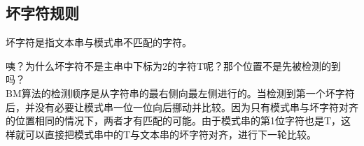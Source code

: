 \subsection{坏字符规则}

坏字符是指文本串与模式串不匹配的字符。

\begin{table}[H]
	\centering
\end{table}

咦？为什么坏字符不是主串中下标为2的字符T呢？那个位置不是先被检测的到吗？ \\

BM算法的检测顺序是从字符串的最右侧向最左侧进行的。当检测到第一个坏字符后，并没有必要让模式串一位一位向后挪动并比较。因为只有模式串与坏字符对齐的位置相同的情况下，两者才有匹配的可能。由于模式串的第1位字符也是T，这样就可以直接把模式串中的T与文本串的坏字符对齐，进行下一轮比较。

